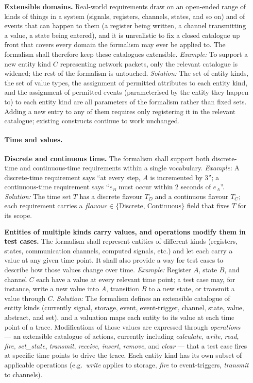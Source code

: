 \textbf{Extensible domains.} Real-world requirements draw on an open-ended range of kinds of things in a system (signals, registers, channels, states, and so on) and of events that can happen to them (a register being written, a channel transmitting a value, a state being entered), and it is unrealistic to fix a closed catalogue up front that covers every domain the formalism may ever be applied to. The formalism shall therefore keep these catalogues extensible. \textit{Example:} To support a new entity kind $C$ representing network packets, only the relevant catalogue is widened; the rest of the formalism is untouched. \textit{Solution:} The set of entity kinds, the set of value types, the assignment of permitted attributes to each entity kind, and the assignment of permitted events (parameterised by the entity they happen to) to each entity kind are all parameters of the formalism rather than fixed sets. Adding a new entry to any of them requires only registering it in the relevant catalogue; existing constructs continue to work unchanged.

\paragraph{Time and values.}

\textbf{Discrete and continuous time.} The formalism shall support both discrete-time and continuous-time requirements within a single vocabulary. \textit{Example:} A discrete-time requirement says ``at every step, $A$ is incremented by $3$''; a continuous-time requirement says ``$e_B$ must occur within $2$ seconds of $e_A$''. \textit{Solution:} The time set $T$ has a discrete flavour $T_D$ and a continuous flavour $T_C$; each requirement carries a $\mathit{flavour} \in \{\text{Discrete},\, \text{Continuous}\}$ field that fixes $T$ for its scope.

\textbf{Entities of multiple kinds carry values, and operations modify them in test cases.} The formalism shall represent entities of different kinds (registers, states, communication channels, computed signals, etc.) and let each carry a value at any given time point. It shall also provide a way for test cases to describe how those values change over time. \textit{Example:} Register $A$, state $B$, and channel $C$ each have a value at every relevant time point; a test case may, for instance, write a new value into $A$, transition $B$ to a new state, or transmit a value through $C$. \textit{Solution:} The formalism defines an extensible catalogue of entity kinds (currently signal, storage, event, event-trigger, channel, state, value, abstract, and set), and a valuation maps each entity to its value at each time point of a trace. Modifications of those values are expressed through \emph{operations} --- an extensible catalogue of actions, currently including \emph{calculate}, \emph{write}, \emph{read}, \emph{fire}, \emph{set\_state}, \emph{transmit}, \emph{receive}, \emph{insert}, \emph{remove}, and \emph{clear} --- that a test case fires at specific time points to drive the trace. Each entity kind has its own subset of applicable operations (e.g.\ \emph{write} applies to storage, \emph{fire} to event-triggers, \emph{transmit} to channels).

